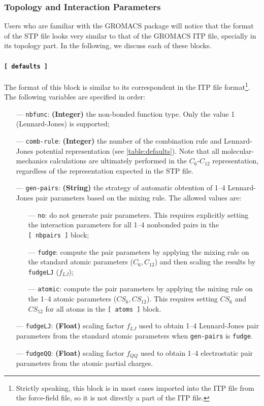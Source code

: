 \documentclass[10pt,a4paper]{report}
\numberwithin{equation}{section}
\begin{document}
\subsubsection{Topology and Interaction Parameters}
\label{sec:stp-topology}

Users who are familiar with the GROMACS package will notice that the
format of the STP file looks very similar to that of the GROMACS ITP
file, specially in its topology part. In the following, we discuss
each of these blocks.

\paragraph{\texttt{[~defaults~]}}

The format of this block is similar to its correspondent in the ITP file format\footnote{Strictly speaking, this block is in most cases imported into the ITP file from the force-field file, so it is not directly a part of the ITP file.}.
The following variables are specified in order:
\begin{itemize}
\item [---] \texttt{nbfunc}: \textbf{(Integer)} the non-bonded function type. Only the value 1 (Lennard-Jones) is supported;
\item [---] \texttt{comb-rule}: \textbf{(Integer)} the number of the combination rule and Lennard-Jones potential representation (see \autoref{table:defaults}).
  Note that all molecular-mechanics calculations are ultimately performed in the $C_6$-$C_{12}$ representation, regardless of the representation expected in the STP file.
\item [---] \texttt{gen-pairs}: \textbf{(String)} the strategy of automatic obtention of  1--4 Lennard-Jones pair parameters based on the mixing rule. The allowed values are:
  \begin{itemize}
  \item [---] \texttt{no}: do not generate pair parameters. This requires explicitly setting the interaction parameters for all 1--4 nonbonded pairs in the \texttt{[~nbpairs~]} block;
  \item [---] \texttt{fudge}: compute the pair parameters by applying the mixing rule on the standard atomic parameters ($C_6,C_{12}$) and then scaling the results by \texttt{fudgeLJ} ($f_{LJ}$);
  \item [---] \texttt{atomic}: compute the pair parameters by applying the mixing rule on the 1--4 atomic parameters ($CS_6,CS_{12}$). This requires setting $CS_6$ and $CS_{12}$ for all atoms in the \texttt{[~atoms~]} block.
  \end{itemize}
\item [---] \texttt{fudgeLJ}: \textbf{(Float)} scaling factor $f_{LJ}$ used to obtain 1--4 Lennard-Jones pair parameters from the standard atomic parameters when \texttt{gen-pairs} is \texttt{fudge}.
\item [---] \texttt{fudgeQQ}: \textbf{(Float)} scaling factor $f_{QQ}$ used to obtain 1--4 electrostatic pair parameters from the atomic partial charges.
\end{itemize}
\end{document}
